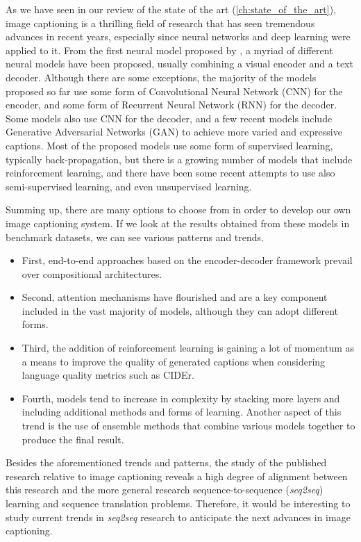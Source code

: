 As we have seen in our review of the state of the art (\cref{ch:state_of_the_art}), image captioning is a thrilling field of research that has seen tremendous advances in recent years, especially since neural networks and deep learning were applied to it. From the first neural model proposed by \citet{Kiros2014_LBL}, a myriad of different neural models have been proposed, usually combining a visual encoder and a text decoder. Although there are some exceptions, the majority of the models proposed so far use some form of Convolutional Neural Network (CNN) for the encoder, and some form of Recurrent Neural Network (RNN) for the decoder. Some models also use CNN for the decoder, and a few recent models include Generative Adversarial Networks (GAN) to achieve more varied and expressive captions. Most of the proposed models use some form of supervised learning, typically back-propagation, but there is a growing number of models that include reinforcement learning, and there have been some recent attempts to use also semi-supervised learning, and even unsupervised learning. 

Summing up, there are many options to choose from in order to develop our own image captioning system. If we look at the results obtained from these models in benchmark datasets, we can see various patterns and trends.

\begin{itemize}
\item First, end-to-end approaches based on the encoder-decoder framework prevail over compositional architectures.
\item Second, attention mechanisms have flourished and are a key component included in the vast majority of models, although they can adopt different forms.
\item Third, the addition of reinforcement learning is gaining a lot of momentum as a means to improve the quality of generated captions when considering language quality metrics such as CIDEr.
\item Fourth, models tend to increase in complexity by stacking more layers and including additional methods and forms of learning. Another aspect of this trend is the use of ensemble methods that combine various models together to produce the final result.
\end{itemize}

Besides the aforementioned trends and patterns, the study of the published research relative to image captioning reveals a 
high degree of alignment between this research and the more general research sequence-to-sequence (\textit{seq2seq}) learning and sequence translation problems. Therefore, it would be interesting to study current trends in \textit{seq2seq} research to anticipate the next advances in image captioning.

